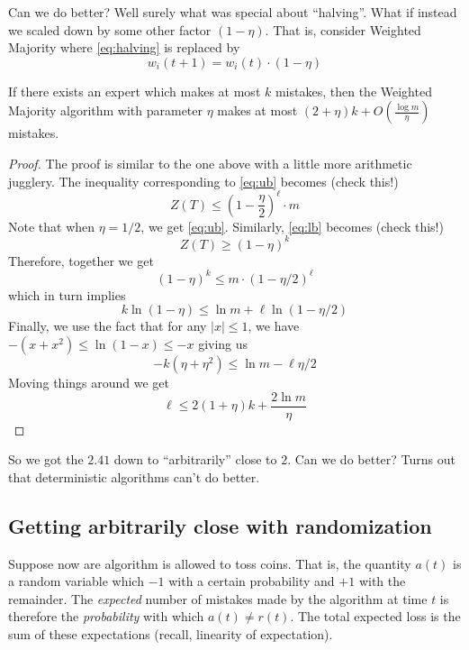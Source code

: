 \documentclass[11pt]{article}
\begin{document}
Can we do better? Well surely what was special about ``halving''. What if instead we scaled down by some other factor $(1- \eta)$. That is, consider {\sc Weighted Majority} where \eqref{eq:halving} is replaced by 
\[
w_i(t+1) = w_i(t) \cdot (1 - \eta)
\]

\begin{theorem}
		If there exists an expert which makes at most $k$ mistakes, then the {\sc Weighted Majority} algorithm with parameter $\eta$ makes at most $(2+\eta)k  + O\left(\frac{\log m}{\eta}\right)$ mistakes.
\end{theorem}
\begin{proof}
	The proof is similar to the one above with a little more arithmetic jugglery. The inequality corresponding to \eqref{eq:ub} becomes (check this!)
	\[
	Z(T) \leq (1 - \frac{\eta}{2})^\ell \cdot m
	\]
	Note that when $\eta = 1/2$, we get \eqref{eq:ub}. Similarly, \eqref{eq:lb} becomes (check this!)
	\[
	Z(T) \geq (1 - \eta)^k
	\]
	Therefore, together we get
	\[
	(1 - \eta)^k \leq m\cdot (1 - \eta/2)^\ell 
	\]
	which in turn implies
	\[
	k\ln(1-\eta) \leq \ln m + \ell \ln(1-\eta/2)
	\]
	Finally, we use the fact that for any $|x|\leq 1$, we have $-(x+x^2) \leq \ln(1-x) \leq -x$ giving us
	\[
	-k(\eta + \eta^2) \leq \ln m - \ell \eta/2
	\]
	Moving things around we get
	\[
	\ell \leq 2(1+\eta)k + \frac{2\ln m}{\eta}
	\]
\end{proof}

So we got the $2.41$ down to ``arbitrarily'' close to $2$. Can we do better? Turns out that deterministic algorithms can't do better.


\subsection{Getting arbitrarily close with randomization}

Suppose now are algorithm is allowed to toss coins. That is, the quantity $a(t)$ is a random variable which $-1$ with a certain probability and $+1$ with the remainder.
The {\em expected} number of mistakes made by the algorithm at time $t$ is therefore the {\em probability} with which $a(t) \neq r(t)$. The total expected loss is the sum of these expectations (recall, linearity of expectation). 
\end{document}
